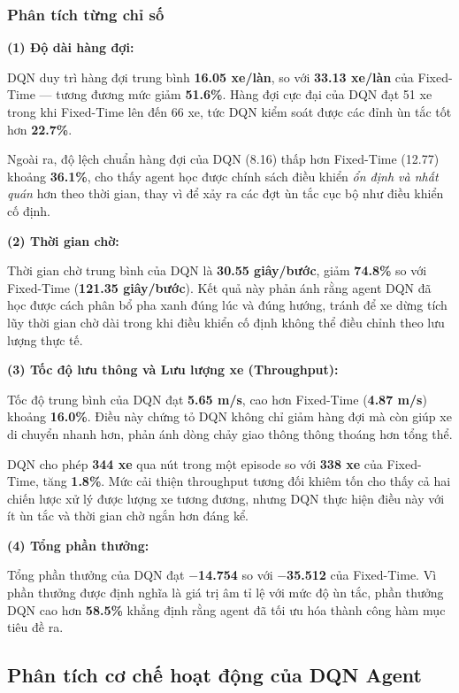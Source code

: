 \subsubsection{Phân tích từng chỉ số}

\textbf{(1) Độ dài hàng đợi:}

DQN duy trì hàng đợi trung bình \textbf{16.05 xe/làn}, so với \textbf{33.13 xe/làn} của Fixed-Time --- tương đương mức giảm \textbf{51.6\%}. Hàng đợi cực đại của DQN đạt 51 xe trong khi Fixed-Time lên đến 66 xe, tức DQN kiểm soát được các đỉnh ùn tắc tốt hơn \textbf{22.7\%}.

Ngoài ra, độ lệch chuẩn hàng đợi của DQN (8.16) thấp hơn Fixed-Time (12.77) khoảng \textbf{36.1\%}, cho thấy agent học được chính sách điều khiển \textit{ổn định và nhất quán} hơn theo thời gian, thay vì để xảy ra các đợt ùn tắc cục bộ như điều khiển cố định.

\textbf{(2) Thời gian chờ:}

Thời gian chờ trung bình của DQN là \textbf{30.55 giây/bước}, giảm \textbf{74.8\%} so với Fixed-Time (\textbf{121.35 giây/bước}). Kết quả này phản ánh rằng agent DQN đã học được cách phân bổ pha xanh đúng lúc và đúng hướng, tránh để xe dừng tích lũy thời gian chờ dài trong khi điều khiển cố định không thể điều chỉnh theo lưu lượng thực tế.

\textbf{(3) Tốc độ lưu thông và Lưu lượng xe (Throughput):}

Tốc độ trung bình của DQN đạt \textbf{5.65 m/s}, cao hơn Fixed-Time (\textbf{4.87 m/s}) khoảng \textbf{16.0\%}. Điều này chứng tỏ DQN không chỉ giảm hàng đợi mà còn giúp xe di chuyển nhanh hơn, phản ánh dòng chảy giao thông thông thoáng hơn tổng thể.

DQN cho phép \textbf{344 xe} qua nút trong một episode so với \textbf{338 xe} của Fixed-Time, tăng \textbf{1.8\%}. Mức cải thiện throughput tương đối khiêm tốn cho thấy cả hai chiến lược xử lý được lượng xe tương đương, nhưng DQN thực hiện điều này với ít ùn tắc và thời gian chờ ngắn hơn đáng kể.

\textbf{(4) Tổng phần thưởng:}

Tổng phần thưởng của DQN đạt \textbf{$-$14.754} so với \textbf{$-$35.512} của Fixed-Time. Vì phần thưởng được định nghĩa là giá trị âm tỉ lệ với mức độ ùn tắc, phần thưởng DQN cao hơn \textbf{58.5\%} khẳng định rằng agent đã tối ưu hóa thành công hàm mục tiêu đề ra.

\subsection{Phân tích cơ chế hoạt động của DQN Agent}

